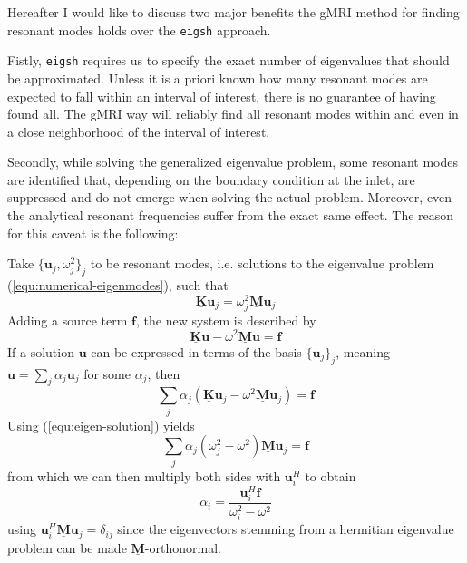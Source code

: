 \documentclass[11pt, a4paper]{article}
\begin{document}
Hereafter I would like to discuss two major benefits the \acrshort{gMRI} method
for finding resonant modes holds over the \texttt{eigsh} approach.

Fistly, \texttt{eigsh} requires us to specify the exact number of eigenvalues that
should be approximated. Unless it is a priori known how many resonant modes are
expected to fall within an interval of interest, there is no guarantee of having
found all. The \acrshort{gMRI} way will reliably find all resonant modes within
and even in a close neighborhood of the interval of interest.

Secondly, while solving the generalized eigenvalue problem, some resonant modes
are identified that, depending on the boundary condition at the inlet, are 
suppressed and do not emerge when solving the actual problem. Moreover, even
the analytical resonant frequencies suffer from the exact same effect. The reason
for this caveat is the following:

Take $\{ \mathbf{u}_j, \omega_j^2 \}_j$ to be resonant modes, i.e. solutions to 
the eigenvalue problem (\ref{equ:numerical-eigenmodes}), such that
\begin{equation}
    \mathbf{\underline{K}} \mathbf{u}_j = \omega_j^2 \mathbf{\underline{M}} \mathbf{u}_j
    \label{equ:eigen-solution}
\end{equation}
Adding a source term $\mathbf{f}$, the new system is described by
\begin{equation}
    \mathbf{\underline{K}} \mathbf{u} - \omega^2 \mathbf{\underline{M}} \mathbf{u} = \mathbf{f}
\end{equation}
If a solution $\mathbf{u}$ can be expressed in terms of the basis $\{ \mathbf{u}_j \}_j$,
meaning $\mathbf{u} = \sum_j \alpha_j \mathbf{u}_j$ for some $\alpha_j$, then
\begin{equation} 
    \sum_j \alpha_j (\mathbf{\underline{K}} \mathbf{u}_j - \omega^2 \mathbf{\underline{M}} \mathbf{u}_j) = \mathbf{f}
\end{equation}
Using (\ref{equ:eigen-solution}) yields
\begin{equation}
    \sum_j \alpha_j (\omega_j^2 - \omega^2) \mathbf{\underline{M}} \mathbf{u}_j = \mathbf{f}
\end{equation}
from which we can then multiply both sides with $\mathbf{u}_i^H$ to obtain
\begin{equation}
    \alpha_i = \frac{\mathbf{u}_i^H \mathbf{f}}{\omega_i^2 - \omega^2} \label{equ:suppression}
\end{equation}
using $\mathbf{u}_i^H \mathbf{\underline{M}} \mathbf{u}_j = \delta_{ij}$
since the eigenvectors stemming from a hermitian eigenvalue problem can be made 
$\mathbf{\underline{M}}$-orthonormal.
\end{document}
